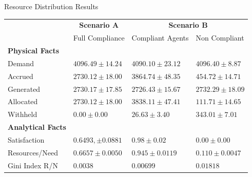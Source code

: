 \documentclass[xcolor={table}]{beamer}
\begin{document}
\begin{frame}[fragile=singleslide,t]
\begin{columns}[onlytextwidth,T]
\begin{column}{.48\textwidth}
\begin{block}{Resource Distribution Results}
\begin{table}[]
\color{black}
\small
\centering
\label{my-label}
\begin{tabular}{l|l|ll|}
\cline{2-4}
                                                & \multicolumn{1}{c|}{\textbf{Scenario A}} & \multicolumn{2}{c|}{\textbf{Scenario B}}     \\
                                                & Full Compliance                          & Compliant Agents     & Non Compliant         \\ \hline
\multicolumn{1}{|l|}{\textbf{Physical Facts}}   &                                          &                      &                       \\
\multicolumn{1}{|l|}{Demand}                    & $4096.49 \pm 14.24$                      & $4090.10 \pm 23.12$  & $4096.40 \pm 8.87$    \\
\multicolumn{1}{|l|}{Accrued}                   & $2730.12 \pm 18.00$                      & $3864.74 \pm 48.35$  & $454.72 \pm 14.71$    \\
\multicolumn{1}{|l|}{Generated}                 & $2730.17 \pm 17.85$                      & $2726.43 \pm 15.67$  & $2732.29 \pm 18.09$   \\
\multicolumn{1}{|l|}{Allocated}                 & $2730.12 \pm 18.00$                      & $3838.11 \pm 47.41$  & $111.71 \pm 14.65$    \\
\multicolumn{1}{|l|}{Withheld}                  & $0.00 \pm 0.00$                          & $26.63 \pm 3.40$     & $343.01 \pm 7.01$     \\
\multicolumn{1}{|l|}{\textbf{Analytical Facts}} &                                          &                      &                       \\
\multicolumn{1}{|l|}{Satisfaction}              & $0.6493,\pm 0.0881$                      & $0.98 \pm 0.02$      & $0.00 \pm 0.00$       \\
\multicolumn{1}{|l|}{Resources/Need}            & $0.6657 \pm 0.0050$                      & $0.945 \pm 0.0119$   & $0.110 \pm 0.0047$    \\
\multicolumn{1}{|l|}{Gini Index R/N}            & $0.0038$                                 & $0.00699$            & $0.01818$             \\ \hline
\end{tabular}
\end{table}


\end{block}
\end{column}
\end{columns}
\end{frame}
\end{document}
